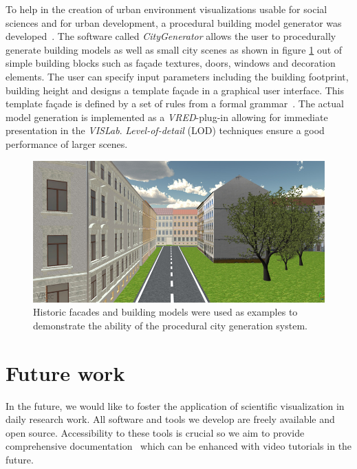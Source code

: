 \documentclass[twocolumn]{svjour3}          %
\begin{document}
To help in the creation of urban environment visualizations usable for social sciences and for urban development, a procedural\cite{procedural:modelling} building model generator was developed~\cite{bilke:master}. The software called \emph{CityGenerator} allows the user to procedurally generate building models as well as small city scenes as shown in figure \ref{fig:city} out of simple building blocks such as fa\c{c}ade textures, doors, windows and decoration elements. The user can specify input parameters including the building footprint, building height and designs a template fa\c{c}ade in a graphical user interface. This template fa\c{c}ade is defined by a set of rules from a formal grammar~\cite{procedural:buildings}. The actual model generation is implemented as a \emph{VRED}-plug-in allowing for immediate presentation in the \emph{VISLab}. \emph{Level-of-detail} (LOD) techniques ensure a good performance of larger scenes.

\begin{figure}[htb]
  \includegraphics[width=\linewidth]{images/city.jpg}
\caption{Historic facades and building models were used as examples to demonstrate the ability of the procedural city generation system.}
\label{fig:city}
\end{figure}

\section{Future work}
\label{future-work}

In the future, we would like to foster the application of scientific visualization in daily research work. All software and tools we develop are freely available and open source. Accessibility to these tools is crucial so we aim to provide comprehensive documentation~\cite{web:ogs-docs} which can be enhanced with video tutorials in the future.
\end{document}
